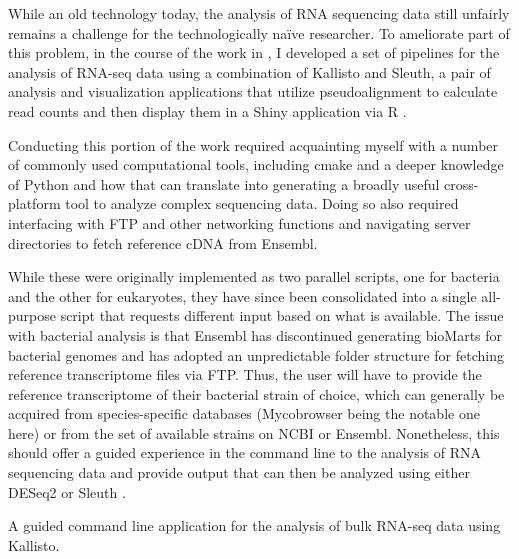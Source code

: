 While an old technology today, the analysis of RNA sequencing data still unfairly remains a challenge for the technologically na\"{i}ve researcher. To ameliorate part of this problem, in the course of the work in \citet{Saelens2022}, I developed a set of pipelines for the analysis of RNA-seq data using a combination of Kallisto and Sleuth, a pair of analysis and visualization applications that utilize pseudoalignment to calculate read counts and then display them in a Shiny application via R \citep{Pimentel2017, Bray2016}.

Conducting this portion of the work required acquainting myself with a number of commonly used computational tools, including cmake and a deeper knowledge of Python and how that can translate into generating a broadly useful cross\hyp{}platform tool to analyze complex sequencing data. Doing so also required interfacing with FTP and other networking functions and navigating server directories to fetch reference cDNA from Ensembl.

While these were originally implemented as two parallel scripts, one for bacteria and the other for eukaryotes, they have since been consolidated into a single all\hyp{}purpose script that requests different input based on what is available. The issue with bacterial analysis is that Ensembl has discontinued generating bioMarts for bacterial genomes and has adopted an unpredictable folder structure for fetching reference transcriptome files via FTP. Thus, the user will have to provide the reference transcriptome of their bacterial strain of choice, which can generally be acquired from species\hyp{}specific databases (Mycobrowser being the notable one here) or from the set of available strains on NCBI or Ensembl. Nonetheless, this should offer a guided experience in the command line to the analysis of RNA sequencing data and provide output that can then be analyzed using either DESeq2 or Sleuth \citep{Pimentel2017, Love2014}.

\begin{code}
\caption{A guided command line application for the analysis of bulk RNA\hyp{}seq data using Kallisto.}
\label{kallisto}

\inputminted[breaklines,frame=single,fontsize=\small]{python}{source/allKallisto.py}

\end{code}

